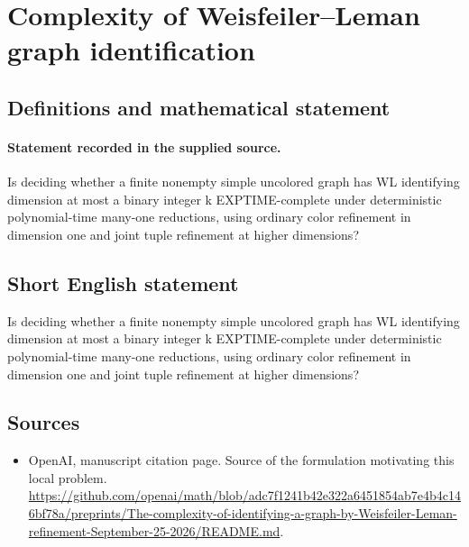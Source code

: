 \documentclass[11pt]{article}
\begin{document}
\section*{Complexity of Weisfeiler–Leman graph identification}\label{statement}
\subsection{Definitions and mathematical statement}
\paragraph{Statement recorded in the supplied source.}
Is deciding whether a finite nonempty simple uncolored graph has WL identifying dimension at most a binary integer k EXPTIME-complete under deterministic polynomial-time many-one reductions, using ordinary color refinement in dimension one and joint tuple refinement at higher dimensions?
\subsection{Short English statement}
Is deciding whether a finite nonempty simple uncolored graph has WL identifying dimension at most a binary integer k EXPTIME-complete under deterministic polynomial-time many-one reductions, using ordinary color refinement in dimension one and joint tuple refinement at higher dimensions?
\subsection{Sources}
\begin{itemize}
\item[S1] OpenAI, manuscript citation page. Source of the formulation motivating this local problem.
\url{https://github.com/openai/math/blob/adc7f1241b42e322a6451854ab7e4b4c146bf78a/preprints/The-complexity-of-identifying-a-graph-by-Weisfeiler-Leman-refinement-September-25-2026/README.md}.
\end{itemize}
\end{document}
